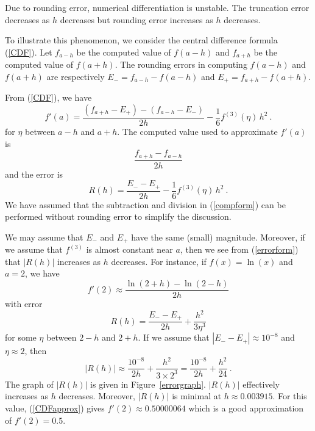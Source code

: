 \begin{rmk}
Due to rounding error, numerical differentiation is unstable.
The truncation error decreases as $h$ decreases but rounding error
increases as $h$ decreases.

To illustrate this phenomenon, we consider the central difference
formula (\ref{CDF}).  Let $f_{a-h}$ be the computed value of
$f(a-h)$ and $f_{a+h}$ be the computed value of $f(a+h)$.
The rounding errors in computing $f(a-h)$ and $f(a+h)$ are 
respectively $E_- = f_{a-h} - f(a-h)$ and $E_+ = f_{a+h} - f(a+h)$.

From (\ref{CDF}), we have
\[
f'(a) = \frac{( f_{a+h}-E_+ ) - ( f_{a-h} -E_- )}{2h}
- \frac{1}{6}f^{(3)}(\eta)\,h^2 \ .
\]
for $\eta$ between $a-h$ and $a+h$.  The computed value used to
approximate $f'(a)$ is
\begin{equation}\label{compform}
\frac{f_{a+h}- f_{a-h}}{2h}
\end{equation}
and the error is
\begin{equation} \label{errorform}
R(h) =  \frac{E_- - E_+ }{2h} - \frac{1}{6}f^{(3)}(\eta)\,h^2 \ .
\end{equation}
We have assumed that the subtraction and division in (\ref{compform})
can be performed without rounding error to simplify the discussion.

We may assume that $E_-$ and $E_+$ have the same (small) magnitude.
Moreover, if we assume that $f^{(3)}$ is almost constant near $a$,
then we see from (\ref{errorform}) that $|R(h)|$ increases as $h$
decreases.  For instance, if $f(x) = \ln(x)$ and $a=2$, we have
\begin{equation} \label{CDFapprox}
f'(2) \approx \frac{\ln(2+h) - \ln(2-h)}{2h}
\end{equation}
with error
\[
R(h) =  \frac{E_- - E_+ }{2h} + \frac{h^2}{3\eta^3}
\]
for some $\eta$ between $2-h$ and $2+h$.  If we assume that
$|E_- - E_+| \approx 10^{-8}$ and $\eta \approx 2$, then
\[
|R(h)| \approx \frac{10^{-8}}{2h} + \frac{h^2}{3\times 2^3}
= \frac{10^{-8}}{2h} + \frac{h^2}{24} \ .
\]
The graph of $|R(h)|$ is given in Figure~\ref{errorgraph}.  $|R(h)|$
effectively increases as $h$ decreases.  Moreover, $|R(h)|$ is minimal
at $h\approx 0.003915$.  For this value, (\ref{CDFapprox}) gives
$f'(2) \approx 0.50000064$ which is a good approximation of $f'(2) = 0.5$.
\end{rmk}


